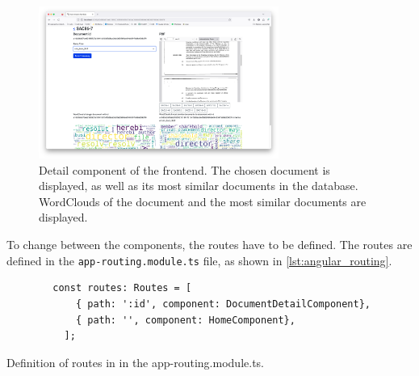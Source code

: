 \begin{figure}[htp] %
    \centering
    \includegraphics[width=0.7\textwidth]{images/UI/Home_detail.png}
    \caption{Detail component of the frontend.
    The chosen document is displayed, as well as its most similar documents in the database.
    WordClouds of the document and the most similar documents are displayed.
    }
    \label{fig:detail_comp}
\end{figure}


To change between the components, the routes have to be defined.
The routes are defined in the \texttt{app-routing.module.ts} file, as shown in \autoref{lst:angular_routing}.

\begin{listing}[htp]
    \begin{verbatim}
        const routes: Routes = [
            { path: ':id', component: DocumentDetailComponent},
            { path: '', component: HomeComponent},
          ];
    \end{verbatim}
    \caption{Definition of routes in \angular{} in the app-routing.module.ts.
    }
    \label{lst:angular_routing}
\end{listing}